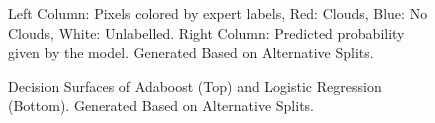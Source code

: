 \documentclass[11pt, letterpaper, journal]{IEEEtran}
\begin{document}
\begin{figure}
    \centering
    \qquad
    \qquad
    \caption{Left Column: Pixels colored by expert labels, Red: Clouds, Blue: No Clouds, White: Unlabelled. Right Column: Predicted probability given by the model. Generated Based on Alternative Splits.}
    \label{fig:Probability_Preds_alt}
\end{figure}

\begin{figure}[!h]
    \centering
    \qquad
    \caption{Decision Surfaces of Adaboost (Top) and Logistic Regression (Bottom). Generated Based on Alternative Splits.}
    \label{fig:decision_surface_alt}
\end{figure}
\end{document}

